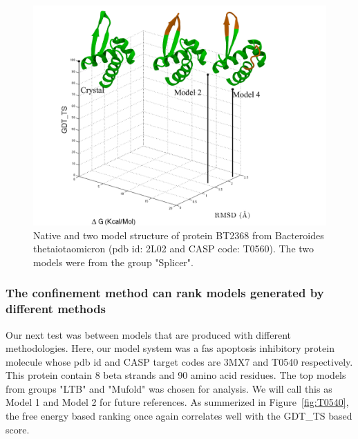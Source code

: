 \documentclass[12pt]{article}
\begin{document}
\begin{figure}
\begin{center}
\includegraphics[width=4.0 in,height=3.0 in]{T0560.pdf}
\end{center}
\caption{Native and two model structure of protein BT2368 from Bacteroides thetaiotaomicron (pdb id: 2L02 and CASP code: T0560). The two models
were from the group "Splicer".}
\label{fig:T0560}
\end{figure}


\subsubsection{The confinement method can rank models generated by different methods}

Our next test was between models that are produced with different methodologies. 
Here, our model system was a fas apoptosis inhibitory protein molecule whose
pdb id and CASP target codes are 3MX7 and T0540 respectively. 
This protein contain 8 beta strands and 90 amino acid residues. 
The top models from groups "LTB" and "Mufold" was chosen for analysis.
We will call this as Model 1 and Model 2 for future references. As summerized in
Figure~\ref{fig:T0540}, the free energy based ranking once again correlates well with the 
GDT\_TS based score.
\end{document}
